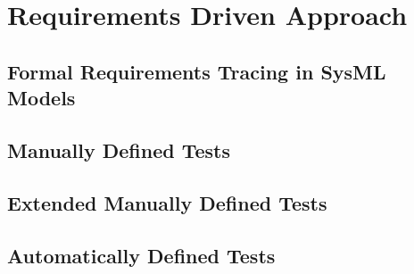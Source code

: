 \section{Requirements Driven Approach}
\label{sec:req}
\subsection{Formal Requirements Tracing in SysML Models}
\label{sec:formaltrc}


\subsection{Manually Defined Tests}
\label{sec:manualTest}

\subsection{Extended Manually Defined Tests}
\label{sec:extendedManualTest}

\subsection{Automatically Defined Tests}
\label{sec:automated_ETCS_test}


